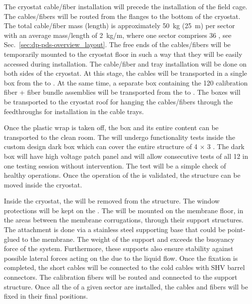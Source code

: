 The cryostat cable/fiber installation will precede the installation of the field cage. The cables/fibers will be routed from the flanges to the bottom of the cryostat. The total cable/fiber mass (length) is approximately \SI{50}{\kg} (\SI{25}{\m}) per sector with an average mass/length of \SI{2}{\kg/\m}, where one sector comprises \num{36} , see Sec.~\ref{sec:dp-pds-overview_layout}. The free ends of the cables/fibers will be temporarily mounted to the cryostat floor in such a way that they will be easily accessed during installation. The cable/fiber and tray installation will be done on both sides of the cryostat. At this stage, the  cables will be transported in a single box from the  to \surf. At the same time, a separate box containing the \num{120} calibration fiber + fiber bundle assemblies will be transported from the  to \surf. The boxes will be transported to the cryostat roof for hanging the cables/fibers through the feedthroughs for installation in the cable trays.  

Once the plastic wrap is taken off, the   box and its entire content can be transported to the clean room. The  will undergo functionality tests inside the custom design dark box which can cover the entire structure of \num{4} $\times$ \num{3} . The dark box will have high voltage patch panel and will allow consecutive tests of all \num{12}  in one testing session without intervention. The test will be a simple check of healthy  operations. Once the operation of the  is validated, the structure can be moved inside the cryostat.

Inside the cryostat, the  will be removed from the structure. The window protections will be kept on the . The  will be mounted on the membrane floor, in the areas between the membrane corrugations, through their support structures. The attachment is done via a stainless steel supporting base that could be point-glued to the membrane. The weight of the support and  exceeds the buoyancy force of the system. Furthermore, these supports also ensure stability against possible lateral forces acting on the  due to the liquid flow. Once the fixation is completed, the short  cables will be connected to the cold  cables with SHV barrel connectors. The calibration fibers will be routed and connected to the support structure. Once all the  of a given  sector are installed, the cables and fibers will be fixed in their final positions.

